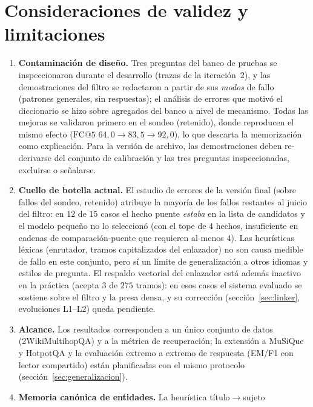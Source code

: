 \documentclass[11pt,a4paper]{article}
\begin{document}
\section{Consideraciones de validez y limitaciones}
\label{sec:validez}

\begin{enumerate}[leftmargin=1.6em, itemsep=2pt]
\item \textbf{Contaminación de diseño.} Tres preguntas del banco de pruebas
  se inspeccionaron durante el desarrollo (trazas de la iteración~2), y las
  demostraciones del filtro se redactaron a partir de sus \emph{modos} de
  fallo (patrones generales, sin respuestas); el análisis de errores que
  motivó el diccionario se hizo sobre agregados del banco a nivel de
  mecanismo. Todas las mejoras se validaron primero en el sondeo
  (retenido), donde reproducen el mismo efecto
  ($\mathrm{FC@}5$ $64{,}0 \to 83{,}5 \to 92{,}0$), lo que descarta la
  memorización como explicación. Para la versión de archivo, las
  demostraciones deben re-derivarse del conjunto de calibración y las tres
  preguntas inspeccionadas, excluirse o señalarse.
\item \textbf{Cuello de botella actual.} El estudio de errores de la
  versión final (sobre fallos del sondeo, retenido) atribuye la mayoría de
  los fallos restantes al juicio del filtro: en $12$ de $15$ casos el hecho
  puente \emph{estaba} en la lista de candidatos y el modelo pequeño no lo
  seleccionó (con el tope de $4$ hechos, insuficiente en cadenas de
  comparación-puente que requieren al menos $4$). Las heurísticas léxicas
  (enrutador, tramos capitalizados del enlazador) no son causa medible de
  fallo en este conjunto, pero sí un límite de generalización a otros
  idiomas y estilos de pregunta. El respaldo vectorial del enlazador está
  además inactivo en la práctica (acepta $3$ de $275$ tramos): en esos
  casos el sistema evaluado se sostiene sobre el filtro y la presa densa,
  y su corrección (sección~\ref{sec:linker}, evoluciones L1--L2) queda
  pendiente.
\item \textbf{Alcance.} Los resultados corresponden a un único conjunto de
  datos (2WikiMultihopQA) y a la métrica de recuperación; la extensión a
  MuSiQue y HotpotQA y la evaluación extremo a extremo de respuesta
  (EM/F1 con lector compartido) están planificadas con el mismo protocolo
  (sección~\ref{sec:generalizacion}).
\item \textbf{Memoria canónica de entidades.} La heurística título$\to$sujeto

\end{enumerate}
\end{document}
